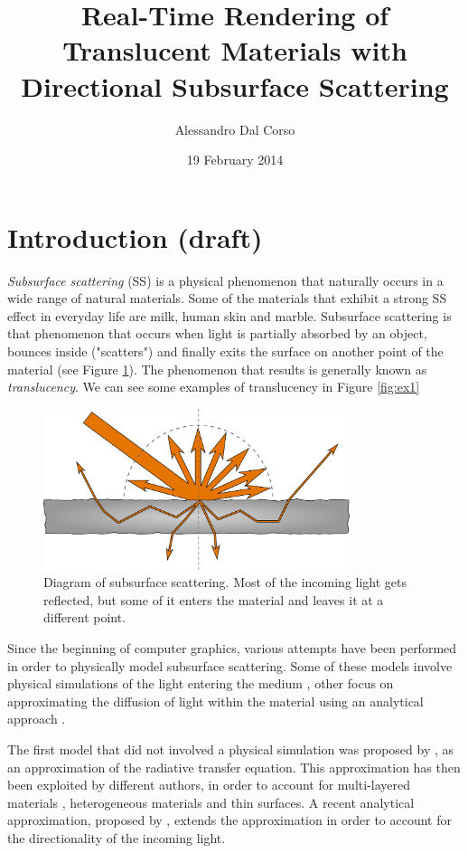 \documentclass[12pt, twoside,a4paper]{article}
\begin{document}
\title{Real-Time Rendering of Translucent Materials with Directional Subsurface Scattering}
\date{19 February 2014}
\author{Alessandro Dal Corso}
\maketitle
\section{Introduction (draft)}
\emph{Subsurface scattering} (SS) is a physical phenomenon that naturally occurs in a wide range of natural materials. Some of the materials that exhibit a strong SS effect in everyday life are milk, human skin and marble. Subsurface scattering is that phenomenon that occurs when light is partially absorbed by an object, bounces inside ("scatters") and finally exits the surface on another point of the material (see Figure \ref{fig:ssdiagram}). The phenomenon that results is generally known as \emph{translucency}. We can see some examples of translucency in Figure \ref{fig:ex1}

\begin{figure}[here]
\centering
\includegraphics[width=0.8\textwidth]{images/diagram}
\caption{Diagram of subsurface scattering. Most of the incoming light gets reflected, but some of it enters the material and leaves it at a different point.}
\label{fig:ssdiagram}
\end{figure}

Since the beginning of computer graphics, various attempts have been performed in order to physically model subsurface scattering. Some of these models involve physical simulations of the light entering the medium \citep{Pharr:2000:MCE:344779.344824,CGF:CGF12148}, other focus on approximating the diffusion of light within the material using an analytical approach \citep{Jensen:2001:PMS:383259.383319}.
 
The first model that did not involved a physical simulation was proposed by \cite{Jensen:2001:PMS:383259.383319}, as an approximation of the radiative transfer equation. This approximation has then been exploited by different authors, in order to account for multi-layered materials \citep{Donner:2005:LDM:1186822.1073308}, heterogeneous materials \citep{journals/cgf/WangWHSYG10} and thin surfaces\citep{journals/cgf/WangWHSYG10}. A recent analytical approximation, proposed by \cite{IMM2013-06646}, extends the approximation in order to account for the directionality of the incoming light. 
\end{document}
